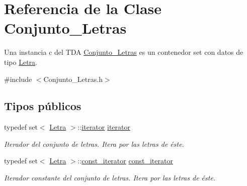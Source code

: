 \hypertarget{classConjunto__Letras}{}\section{Referencia de la Clase Conjunto\+\_\+\+Letras}
\label{classConjunto__Letras}


Una instancia c del T\+DA \hyperlink{classConjunto__Letras}{Conjunto\+\_\+\+Letras} es un contenedor set con datos de tipo \hyperlink{classLetra}{Letra}.  




{\ttfamily \#include $<$Conjunto\+\_\+\+Letras.\+h$>$}

\subsection*{Tipos públicos}
\begin{DoxyCompactItemize}
\item 
\mbox{\label{classConjunto__Letras_a2be8a16582f74bbe7561955083f02a52}} 
typedef set$<$ \hyperlink{classLetra}{Letra} $>$\+::\hyperlink{classConjunto__Letras_a2be8a16582f74bbe7561955083f02a52}{iterator} \hyperlink{classConjunto__Letras_a2be8a16582f74bbe7561955083f02a52}{iterator}
\begin{DoxyCompactList}\small\item\em Iterador del conjunto de letras. Itera por las letras de éste. \end{DoxyCompactList}\item 
\mbox{\label{classConjunto__Letras_a66b252ad22ca76b522ef68fc7e6d09b1}} 
typedef set$<$ \hyperlink{classLetra}{Letra} $>$\+::\hyperlink{classConjunto__Letras_a66b252ad22ca76b522ef68fc7e6d09b1}{const\+\_\+iterator} \hyperlink{classConjunto__Letras_a66b252ad22ca76b522ef68fc7e6d09b1}{const\+\_\+iterator}
\begin{DoxyCompactList}\small\item\em Iterador constante del conjunto de letras. Itera por las letras de éste. \end{DoxyCompactList}\end{DoxyCompactItemize}
